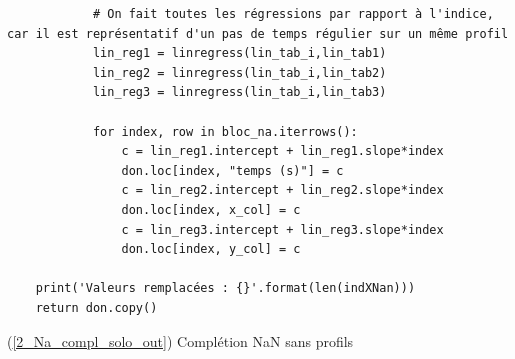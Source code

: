 \documentclass[12pt]{article}
\begin{document}
\begin{lstlisting}
            # On fait toutes les régressions par rapport à l'indice, car il est représentatif d'un pas de temps régulier sur un même profil
            lin_reg1 = linregress(lin_tab_i,lin_tab1)
            lin_reg2 = linregress(lin_tab_i,lin_tab2)
            lin_reg3 = linregress(lin_tab_i,lin_tab3)

            for index, row in bloc_na.iterrows():
                c = lin_reg1.intercept + lin_reg1.slope*index
                don.loc[index, "temps (s)"] = c
                c = lin_reg2.intercept + lin_reg2.slope*index
                don.loc[index, x_col] = c
                c = lin_reg3.intercept + lin_reg3.slope*index
                don.loc[index, y_col] = c
        
    print('Valeurs remplacées : {}'.format(len(indXNan)))
    return don.copy()\end{lstlisting}

\newpage
    \label{2_Na_compl_solo_in} (\ref{2_Na_compl_solo_out}) Complétion NaN sans profils
\end{document}
